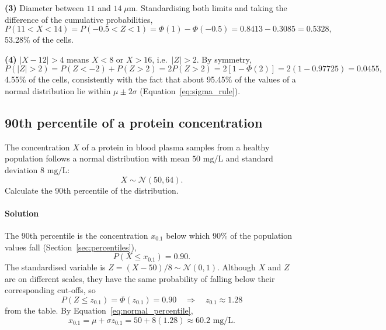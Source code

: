 \textbf{(3)} Diameter between $11$ and $14\;\mu\text{m}$. Standardising both limits and taking the difference of the cumulative probabilities,
\begin{equation*}
P(11 < X < 14) = P(-0.5 < Z < 1) = \Phi(1) - \Phi(-0.5) = 0.8413 - 0.3085 = 0.5328,
\end{equation*}
53.28\% of the cells.

\textbf{(4)} $|X - 12| > 4$ means $X < 8$ or $X > 16$, i.e.\ $|Z| > 2$. By symmetry,
\begin{equation*}
P(|Z| > 2) = P(Z < -2) + P(Z > 2) = 2P(Z > 2) = 2\left[1 - \Phi(2)\right] = 2(1 - 0.97725) = 0.0455,
\end{equation*}
4.55\% of the cells, consistently with the fact that about 95.45\% of the values of a normal distribution lie within $\mu \pm 2\sigma$ (Equation~\eqref{eq:sigma_rule}).

\subsection{90th percentile of a protein concentration}
\label{ex:percentile_protein}

The concentration $X$ of a protein in blood plasma samples from a healthy population follows a normal distribution with mean $50\text{ mg/L}$ and standard deviation $8\text{ mg/L}$:
\begin{equation*}
X \sim \mathcal{N}(50, 64).
\end{equation*}
Calculate the 90th percentile of the distribution.

\paragraph{Solution} The 90th percentile is the concentration $x_{0.1}$ below which 90\% of the population values fall (Section~\ref{sec:percentiles}),
\begin{equation*}
P(X \le x_{0.1}) = 0.90.
\end{equation*}
The standardised variable is $Z = (X - 50)/8 \sim \mathcal{N}(0, 1)$. Although $X$ and $Z$ are on different scales, they have the same probability of falling below their corresponding cut-offs, so
\begin{equation*}
P(Z \le z_{0.1}) = \Phi(z_{0.1}) = 0.90 \quad \Longrightarrow \quad z_{0.1} \approx 1.28
\end{equation*}
from the table. By Equation~\eqref{eq:normal_percentile},
\begin{equation*}
x_{0.1} = \mu + \sigma z_{0.1} = 50 + 8(1.28) \approx 60.2\text{ mg/L}.
\end{equation*}

